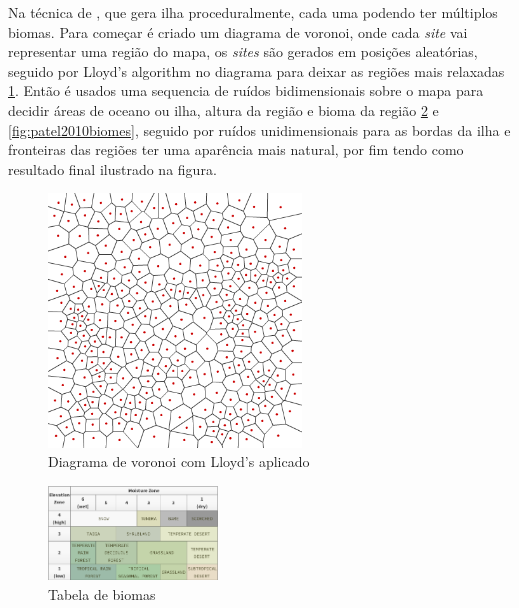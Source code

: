 Na técnica de \cite{patel2010polygonal}, que gera ilha proceduralmente, cada uma podendo ter
múltiplos biomas. Para começar é criado um diagrama de voronoi, onde cada \textit{site}
vai representar uma região do mapa, os \textit{sites} são gerados em posições
aleatórias, seguido por Lloyd's algorithm no diagrama para deixar as regiões mais relaxadas \ref{fig:voronoi-2-lloyd}.
Então é usados uma sequencia de ruídos bidimensionais sobre o mapa para decidir
áreas de oceano ou ilha, altura da região e bioma da região \ref{fig:patel2010tablebiomes} e \ref{fig:patel2010biomes}, seguido por ruídos
unidimensionais para as bordas da ilha e fronteiras das regiões ter uma aparência mais natural, 
por fim tendo como resultado final ilustrado na figura. 
\begin{figure}[H]
    \captionsetup{justification=raggedright, singlelinecheck=false}
    \centering
    \includegraphics[width=0.6\textwidth]{figuras/voronoi-2-lloyd.png}
    \caption{Diagrama de voronoi com Lloyd's aplicado}
    \label{fig:voronoi-2-lloyd}
\end{figure}

\begin{figure}[H]
    \captionsetup{justification=raggedright, singlelinecheck=false}
    \centering
    \includegraphics[width=0.4\textwidth]{figuras/patel2010tablebiomes.png}
    \caption{Tabela de biomas}
    \label{fig:patel2010tablebiomes}
\end{figure}

